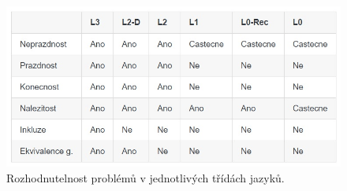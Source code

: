 \begin{figure}[H]
    \centering
    \includegraphics[width=1\linewidth]{rozhodnutelnost_jazyku.png}
    \caption{Rozhodnutelnost problémů v jednotlivých třídách jazyků.}
\end{figure}

